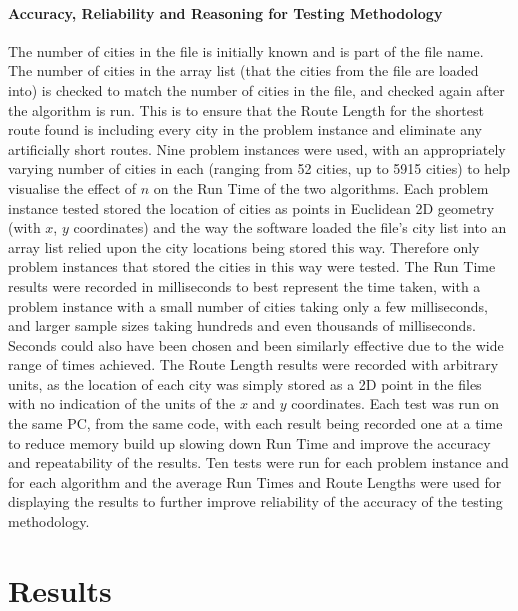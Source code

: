 \documentclass[conference,backref=page]{acmsiggraph}
\begin{document}
\paragraph{Accuracy, Reliability and Reasoning for Testing Methodology}
 The number of cities in the file is initially known and is part of the file name. The number of cities in the array list (that the cities from the file are loaded into) is checked to match the number of cities in the file, and checked again after the algorithm is run. This is to ensure that the Route Length for the shortest route found is including every city in the problem instance and eliminate any artificially short routes. Nine problem instances were used, with an appropriately varying number of cities in each (ranging from 52 cities, up to 5915 cities) to help visualise the effect of $n$ on the Run Time of the two algorithms. Each problem instance tested stored the location of cities as points in Euclidean 2D geometry (with $x$, $y$ coordinates) and the way the software loaded the file's city list into an array list relied upon the city locations being stored this way. Therefore only problem instances that stored the cities in this way were tested. The Run Time results were recorded in milliseconds to best represent the time taken, with a problem instance with a small number of cities taking only a few milliseconds, and larger sample sizes taking hundreds and even thousands of milliseconds. Seconds could also have been chosen and been similarly effective due to the wide range of times achieved. The Route Length results were recorded with arbitrary units, as the location of each city was simply stored as a 2D point in the files with no indication of the units of the $x$ and $y$ coordinates. Each test was run on the same PC, from the same code, with each result being recorded one at a time to reduce memory build up slowing down Run Time and improve the accuracy and repeatability of the results. Ten tests were run for each problem instance and for each algorithm and the average Run Times and Route Lengths were used for displaying the results to further improve reliability of the accuracy of the testing methodology.


\section{Results}
\end{document}
